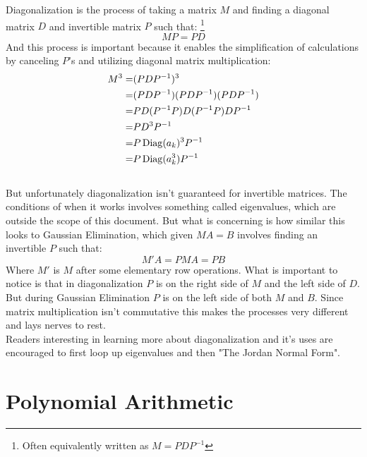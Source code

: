 Diagonalization is the process of taking a matrix $M$ and finding a diagonal matrix $D$ and invertible matrix $P$ such that:
\footnote{Often equivalently written as $M = PDP^{-1}$}
\[MP = PD\]
And this process is important because it enables the simplification of calculations by canceling $P$'s and utilizing diagonal matrix multiplication:
\begin{equation*}
\begin{aligned}
 M^3 =& (PDP^{-1})^3 \\
 =& (PDP^{-1})(PDP^{-1})(PDP^{-1}) \\
 =& PD(P^{-1} P)D(P^{-1} P)DP^{-1} \\
 =& PD^3P^{-1} \\
 =& P\operatorname{Diag}(a_k)^3P^{-1} \\
 =& P\operatorname{Diag}(a_k^3)P^{-1} \\
\end{aligned}
\end{equation*}
\\

But unfortunately diagonalization isn't guaranteed for invertible matrices.
The conditions of when it works involves something called eigenvalues,
which are outside the scope of this document.
But what is concerning is how similar this looks to Gaussian Elimination,
which given $MA =B$ involves finding an invertible $P$ such that:
\[M'A =PMA = PB\]
Where $M'$ is $M$ after some elementary row operations.
What is important to notice is that in diagonalization $P$ is on the right side of $M$ and the left side of $D$.
But during Gaussian Elimination $P$ is on the left side of both $M$ and $B$.
Since matrix multiplication isn't commutative this makes the processes very different and lays nerves to rest. 
\\

Readers interesting in learning more about diagonalization and it's uses are encouraged to first loop up eigenvalues and then "The Jordan Normal Form".

\section{Polynomial Arithmetic}
